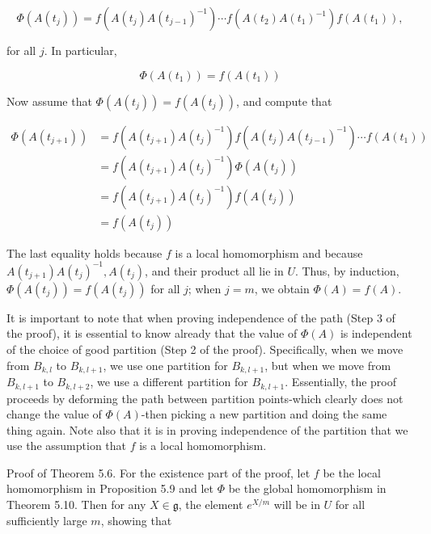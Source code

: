 \documentclass[10pt, letterpaper]{article}
\begin{document}
$$
\Phi\left(A\left(t_{j}\right)\right)=f\left(A\left(t_{j}\right) A\left(t_{j-1}\right)^{-1}\right) \cdots f\left(A\left(t_{2}\right) A\left(t_{1}\right)^{-1}\right) f\left(A\left(t_{1}\right)\right),
$$

for all $j$. In particular,

$$
\Phi\left(A\left(t_{1}\right)\right)=f\left(A\left(t_{1}\right)\right)
$$

Now assume that $\Phi\left(A\left(t_{j}\right)\right)=f\left(A\left(t_{j}\right)\right)$, and compute that

$$
\begin{aligned}
\Phi\left(A\left(t_{j+1}\right)\right) & =f\left(A\left(t_{j+1}\right) A\left(t_{j}\right)^{-1}\right) f\left(A\left(t_{j}\right) A\left(t_{j-1}\right)^{-1}\right) \cdots f\left(A\left(t_{1}\right)\right) \\
& =f\left(A\left(t_{j+1}\right) A\left(t_{j}\right)^{-1}\right) \Phi\left(A\left(t_{j}\right)\right) \\
& =f\left(A\left(t_{j+1}\right) A\left(t_{j}\right)^{-1}\right) f\left(A\left(t_{j}\right)\right) \\
& =f\left(A\left(t_{j}\right)\right)
\end{aligned}
$$

The last equality holds because $f$ is a local homomorphism and because $A\left(t_{j+1}\right) A\left(t_{j}\right)^{-1}, A\left(t_{j}\right)$, and their product all lie in $U$. Thus, by induction, $\Phi\left(A\left(t_{j}\right)\right)=f\left(A\left(t_{j}\right)\right)$ for all $j$; when $j=m$, we obtain $\Phi(A)=f(A)$.

It is important to note that when proving independence of the path (Step 3 of the proof), it is essential to know already that the value of $\Phi(A)$ is independent of the choice of good partition (Step 2 of the proof). Specifically, when we move from $B_{k, l}$ to $B_{k, l+1}$, we use one partition for $B_{k, l+1}$, but when we move from $B_{k, l+1}$ to $B_{k, l+2}$, we use a different partition for $B_{k, l+1}$. Essentially, the proof proceeds by deforming the path between partition points-which clearly does not change the value of $\Phi(A)$-then picking a new partition and doing the same thing again. Note also that it is in proving independence of the partition that we use the assumption that $f$ is a local homomorphism.

Proof of Theorem 5.6. For the existence part of the proof, let $f$ be the local homomorphism in Proposition 5.9 and let $\Phi$ be the global homomorphism in Theorem 5.10. Then for any $X \in \mathfrak{g}$, the element $e^{X / m}$ will be in $U$ for all sufficiently large $m$, showing that
\end{document}
